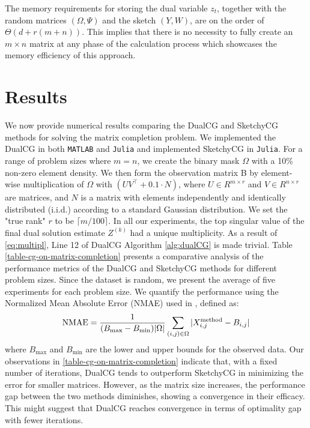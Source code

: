 \documentclass[10pt, twocolumn, reqno, a4paper,oneside]{amsart}
\numberwithin{equation}{section}
\numberwithin{theorem}{section}
\numberwithin{figure}{section}
\numberwithin{table}{section}
\numberwithin{theorem}{section}
\numberwithin{equation}{section}
\begin{document}
The memory requirements for storing the dual variable \( z_t \), together with the random matrices \( (\Omega, \Psi) \) and the sketch \( (Y, W) \), are on the order of \( \Theta(d + r(m + n)) \). This implies that there is no necessity to fully create an \( m \times n \) matrix at any phase of the calculation process which showcases the memory efficiency of this approach.


\section{Results}
We now provide numerical results comparing the DualCG and SketchyCG methods for solving the matrix completion problem. We implemented the DualCG in both {\tt MATLAB} and {\tt Julia} and implemented SketchyCG in {\tt Julia}. For a range of problem sizes where $m=n$, we create the binary mask $\Omega$ with a 10\% non-zero element density. We then form the observation matrix B by element-wise multiplication of $\Omega$ with $(U V^\top + 0.1 \cdot N)$, where $U\in R^{m\times r}$ and $V \in R^{n\times r}$ are matrices, and $N$ is a matrix with elements independently and identically distributed (i.i.d.) according to a standard Gaussian distribution. We set the "true rank" $r$ to be $\lceil m/100 \rceil$. In all our experiments, the top singular value of the final dual solution estimate $Z^{(k)}$ had a unique multiplicity. As a result of \ref{eq:multipl}, Line 12 of DualCG Algorithm \ref{alg:dualCG} is made trivial.
Table \ref{table-cg-on-matrix-completion} presents a comparative analysis of the performance metrics of the DualCG and SketchyCG methods for different problem sizes.
Since the dataset is random, we present the average of five experiments for each problem size.
We quantify the performance using the Normalized Mean Absolute
Error (NMAE) used in \cite{Ma2009FixedPA}, defined as:
\begin{equation*}
	{\rm NMAE} = \frac{1}{(B_{\text{max}} - B_{\text{min}})|\Omega|}
	\sum_{(i,j) \in \Omega} |X^{\rm method}_{i,j} - B_{i,j}|
\end{equation*}
where $B_{\text{max}}$ and $B_{\text{min}}$ are the lower and upper bounds for the observed data.
Our observations in \ref{table-cg-on-matrix-completion} indicate that, with a fixed number of iterations, DualCG tends to outperform SketchyCG in minimizing the error for smaller matrices. However, as the matrix size increases, the performance gap between the two methods diminishes, showing a convergence in their efficacy. This might suggest that DualCG reaches convergence in terms of optimality gap with fewer iterations.
\end{document}
